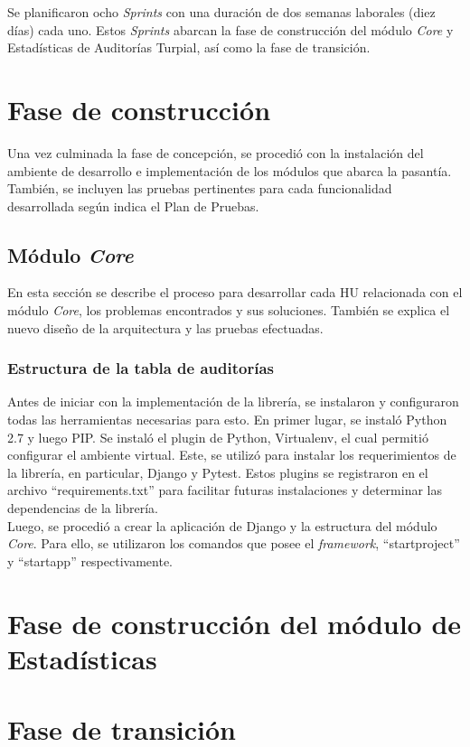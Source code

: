 Se planificaron ocho \textit{Sprints} con una duración de dos semanas laborales (diez días) cada uno. Estos \textit{Sprints} abarcan la fase de construcción del módulo \textit{Core} y Estadísticas de Auditorías Turpial, así como la fase de transición.

\section{Fase de construcción}

Una vez culminada la fase de concepción, se procedió con la instalación del ambiente de desarrollo e implementación de los módulos que abarca la pasantía. También, se incluyen las pruebas pertinentes para cada funcionalidad desarrollada según indica el Plan de Pruebas.

\subsection{Módulo \textit{Core}}

En esta sección se describe el proceso para desarrollar cada HU relacionada con el módulo \textit{Core}, los problemas encontrados y sus soluciones. También se explica el nuevo diseño de la arquitectura y las pruebas efectuadas.

\subsubsection{Estructura de la tabla de auditorías}

Antes de iniciar con la implementación de la librería, se instalaron y configuraron todas las herramientas necesarias para esto. En primer lugar, se instaló Python 2.7 y luego PIP. Se instaló el plugin de Python, Virtualenv, el cual permitió configurar el ambiente virtual. Este, se utilizó para instalar los requerimientos de la librería, en particular, Django y Pytest. Estos plugins se registraron en el archivo “requirements.txt” para facilitar futuras instalaciones y determinar las dependencias de la librería.\\

Luego, se procedió a crear la aplicación de Django y la estructura del módulo \textit{Core}. Para ello, se utilizaron los comandos que posee el \textit{framework}, “startproject” y “startapp” respectivamente.

\section{Fase de construcción del módulo de Estadísticas}
\section{Fase de transición}
